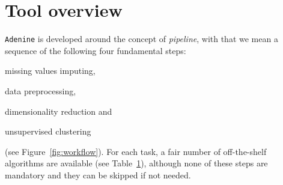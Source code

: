 \documentclass[twoside,11pt]{article}
\makeatletter
\newcommand{\ade}{\texttt{Adenine}\@\xspace}
\makeatother
\begin{document}
\section{Tool overview}\label{sec:implem}
\ade is developed around the concept of \emph{pipeline}, with that we mean a sequence of the following four fundamental steps:
\begin{enumerate*}[label=(\roman*)]
  \item missing values imputing,
  \item data preprocessing,
  \item dimensionality reduction and
  \item unsupervised clustering
\end{enumerate*} (see Figure~\ref{fig:workflow}).
For each task, a fair number of off-the-shelf algorithms are available (see Table~\ref{sec:implem}), although none of these steps are mandatory and they can be skipped if not needed.
\end{document}

